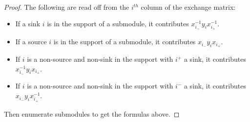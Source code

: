 \documentclass[11pt]{amsart}
\numberwithin{equation}{section}
\begin{document}
  \begin{proof}
    The following are read off from the $i^{th}$ column of the exchange matrix:
    \begin{itemize}
      \item If a sink $i$ is in the support of a submodule, it contributes $x_{i_-}^{-1}y_ix_{i_+}^{-1}$.
      \item If a source $i$ is in the support of a submodule, it contributes $x_{i_-}y_ix_{i_+}$.
      \item If $i$ is a non-source and non-sink in the support with $i^+$ a sink, it contributes $x_{i_-}^{-1}y_ix_{i_+}$.
      \item If $i$ is a non-source and non-sink in the support with $i^-$ a sink, it contributes $x_{i_-}y_ix_{i_+}^{-1}$.
    \end{itemize}
    Then enumerate submodules to get the formulas above.
  \end{proof}
\end{document}
